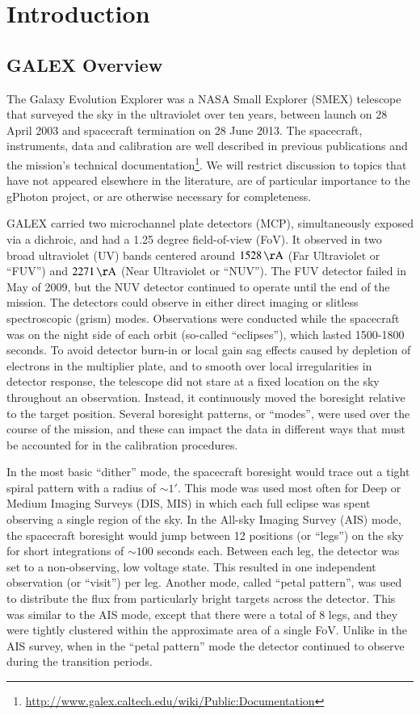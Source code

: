 \documentclass[5p]{elsarticle}
\begin{document}
\linenumbers

\section{Introduction}
\subsection{GALEX Overview}
The Galaxy Evolution Explorer \citep[GALEX;][]{mar2005} was a NASA Small Explorer (SMEX) telescope that surveyed the sky in the ultraviolet over ten years, between launch on 28 April 2003 and spacecraft termination on 28 June 2013. The spacecraft, instruments, data and calibration are well described in previous publications \citep{mor2005,mor2007} and the mission’s technical documentation\footnote{\url{http://www.galex.caltech.edu/wiki/Public:Documentation}}. We will restrict discussion to topics that have not appeared elsewhere in the literature, are of particular importance to the gPhoton project, or are otherwise necessary for completeness.

GALEX carried two microchannel plate detectors (MCP), simultaneously exposed via a dichroic, and had a 1.25 degree field-of-view (FoV).  It observed in two broad ultraviolet (UV) bands centered around $1528\,\rm{\AA}$ (Far Ultraviolet or ``FUV'') and $2271\,\rm{\AA}$ (Near Ultraviolet or ``NUV'').  The FUV detector failed in May of 2009, but the NUV detector continued to operate until the end of the mission. The detectors could observe in either direct imaging or slitless spectroscopic (grism) modes. Observations were conducted while the spacecraft was on the night side of each orbit (so-called ``eclipses''), which lasted 1500-1800 seconds. To avoid detector burn-in or local gain sag effects caused by depletion of electrons in the multiplier plate, and to smooth over local irregularities in detector response, the telescope did not stare at a fixed location on the sky throughout an observation.  Instead, it continuously moved the boresight relative to the target position. Several boresight patterns, or ``modes'', were used over the course of the mission, and these can impact the data in different ways that must be accounted for in the calibration procedures.

In the most basic ``dither'' mode, the spacecraft boresight would trace out a tight spiral pattern with a radius of $\sim 1'$.  This mode was used most often for Deep or Medium Imaging Surveys (DIS, MIS) in which each full eclipse was spent observing a single region of the sky. In the All-sky Imaging Survey (AIS) mode, the spacecraft boresight would jump between 12 positions (or ``legs'') on the sky for short integrations of $\sim 100$ seconds each.  Between each leg, the detector was set to a non-observing, low voltage state.  This resulted in one independent observation (or ``visit'') per leg.  Another mode, called ``petal pattern'', was used to distribute the flux from particularly bright targets across the detector.  This was similar to the AIS mode, except that there were a total of 8 legs, and they were tightly clustered within the approximate area of a single FoV.  Unlike in the AIS survey, when in the ``petal pattern'' mode the detector continued to observe during the transition periods.
\end{document}
